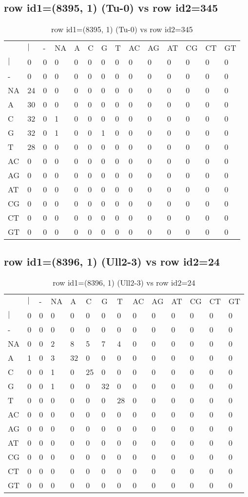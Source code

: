 \subsection{row id1=(8395, 1) (Tu-0) vs row id2=345}
\begin{center}
\begin{longtable}{|l|l|l|l|l|l|l|l|l|l|l|l|l|l|}
\caption{row id1=(8395, 1) (Tu-0) vs row id2=345} \label{table_dm652}\\
\hline
\\
\hline
&$|$&-&NA&A&C&G&T&AC&AG&AT&CG&CT&GT\\
$|$&0&0&0&0&0&0&0&0&0&0&0&0&0\\
-&0&0&0&0&0&0&0&0&0&0&0&0&0\\
NA&24&0&0&0&0&0&0&0&0&0&0&0&0\\
A&30&0&0&0&0&0&0&0&0&0&0&0&0\\
C&32&0&1&0&0&0&0&0&0&0&0&0&0\\
G&32&0&1&0&0&1&0&0&0&0&0&0&0\\
T&28&0&0&0&0&0&0&0&0&0&0&0&0\\
AC&0&0&0&0&0&0&0&0&0&0&0&0&0\\
AG&0&0&0&0&0&0&0&0&0&0&0&0&0\\
AT&0&0&0&0&0&0&0&0&0&0&0&0&0\\
CG&0&0&0&0&0&0&0&0&0&0&0&0&0\\
CT&0&0&0&0&0&0&0&0&0&0&0&0&0\\
GT&0&0&0&0&0&0&0&0&0&0&0&0&0\\
\hline
\end{longtable}
\end{center}

\subsection{row id1=(8396, 1) (Ull2-3) vs row id2=24}
\begin{center}
\begin{longtable}{|l|l|l|l|l|l|l|l|l|l|l|l|l|l|}
\caption{row id1=(8396, 1) (Ull2-3) vs row id2=24} \label{table_dm654}\\
\hline
\\
\hline
&$|$&-&NA&A&C&G&T&AC&AG&AT&CG&CT&GT\\
$|$&0&0&0&0&0&0&0&0&0&0&0&0&0\\
-&0&0&0&0&0&0&0&0&0&0&0&0&0\\
NA&0&0&2&8&5&7&4&0&0&0&0&0&0\\
A&1&0&3&32&0&0&0&0&0&0&0&0&0\\
C&0&0&1&0&25&0&0&0&0&0&0&0&0\\
G&0&0&1&0&0&32&0&0&0&0&0&0&0\\
T&0&0&0&0&0&0&28&0&0&0&0&0&0\\
AC&0&0&0&0&0&0&0&0&0&0&0&0&0\\
AG&0&0&0&0&0&0&0&0&0&0&0&0&0\\
AT&0&0&0&0&0&0&0&0&0&0&0&0&0\\
CG&0&0&0&0&0&0&0&0&0&0&0&0&0\\
CT&0&0&0&0&0&0&0&0&0&0&0&0&0\\
GT&0&0&0&0&0&0&0&0&0&0&0&0&0\\
\hline
\end{longtable}
\end{center}

